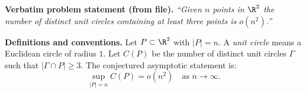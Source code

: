 \noindent\textbf{Verbatim problem statement (from file).}
\emph{``Given $n$ points in $\R^2$ the number of distinct unit circles containing at least three points is $o(n^2)$.''}

\medskip
\noindent\textbf{Definitions and conventions.}
Let $P\subset\R^2$ with $|P|=n$.
A \emph{unit circle} means a Euclidean circle of radius $1$.
Let $C(P)$ be the number of distinct unit circles $\Gamma$ such that $|\Gamma\cap P|\ge 3$.
The conjectured asymptotic statement is:
\[\sup_{|P|=n} C(P) = o(n^2)\quad\text{as }n\to\infty.
\]
